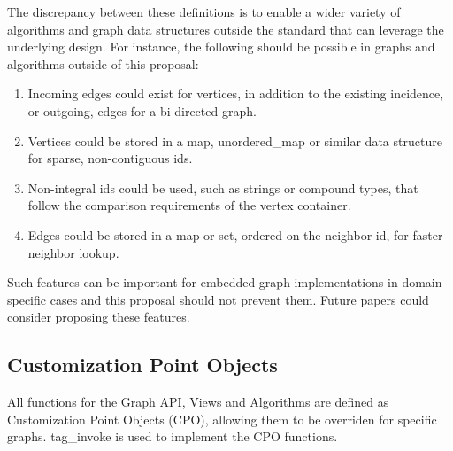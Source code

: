 \documentclass[10pt,onecolumn]{article}
\begin{document}
The discrepancy between these definitions is to enable a wider variety of algorithms and graph data structures outside the standard that 
can leverage the underlying design. For instance, the following should be possible in graphs and algorithms outside of this proposal:

\begin{enumerate}
\item Incoming edges could exist for vertices, in addition to the existing incidence, or outgoing, edges for a bi-directed graph.
\item Vertices could be stored in a map, unordered\_map or similar data structure for sparse, non-contiguous ids.
\item Non-integral ids could be used, such as strings or compound types, that follow the comparison requirements of the vertex container.
\item Edges could be stored in a map or set, ordered on the neighbor id, for faster neighbor lookup.
\end{enumerate}

Such features can be important for embedded graph implementations in domain-specific cases and this proposal should not prevent them. 
Future papers could consider proposing these features.

\subsection{Customization Point Objects}
All functions for the Graph API, Views and Algorithms are defined as Customization Point Objects (CPO), allowing them to be overriden for
specific graphs. tag\_invoke is used to implement the CPO functions.
\end{document}
